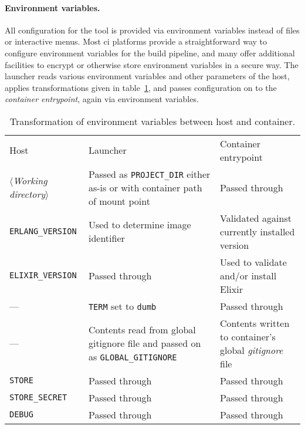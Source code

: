 \cleardoublepage
\paragraph{Environment variables.} All configuration for the tool is provided via environment variables instead of files or interactive menus. Most \acrlong{ci} platforms provide a straightforward way to configure environment variables for the build pipeline, and many offer additional facilities to encrypt or otherwise store environment variables in a secure way. The launcher reads various environment variables and other parameters of the host, applies transformations given in table~\ref{table:envvars}, and passes configuration on to the \emph{container entrypoint}, again via environment variables.

\begin{table}[h]
  \setlength{\tabcolsep}{10pt}
  \centering
  \begin{tabularx}{\textwidth}{l X X}
    Host & Launcher & Container entrypoint \\
    \hhline{===}
    $\langle$\emph{Working directory}$\rangle$ &
      Passed as \lstinline|PROJECT_DIR| \newline
      either as-is or with container path of mount point &
      Passed through \\
    \hline
    \lstinline|ERLANG_VERSION| &
      Used to determine \newline
      image identifier &
      Validated against \newline
      currently installed version \\
    \hline
    \lstinline|ELIXIR_VERSION| &
      Passed through &
      Used to validate and/or \newline
      install Elixir \\
    \hline
    --- &
      \lstinline|TERM| set to \lstinline|dumb| &
      Passed through \\
    \hline
    --- &
      Contents read from global gitignore
      file and passed on as \lstinline|GLOBAL_GITIGNORE| &
      Contents written to \newline
      container's global \newline
      \emph{gitignore} file \\
    \hline
    \lstinline|STORE| & Passed through & Passed through \\
    \hline
    \lstinline|STORE_SECRET| & Passed through & Passed through \\
    \hline
    \lstinline|DEBUG| & Passed through & Passed through \\
    \hline
  \end{tabularx}
  \caption{Transformation of environment variables between host and container.}\label{table:envvars}
\end{table}

